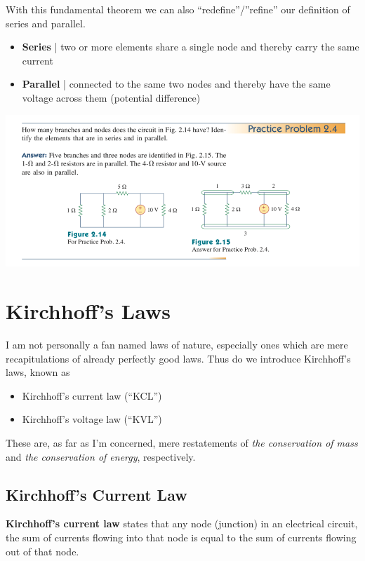 \documentclass[11pt]{book}
\begin{document}
With this fundamental theorem we can also “redefine”/”refine” our definition of series and parallel.
\begin{itemize}
	\item \textbf{Series} | two or more elements share a single node and thereby carry the same current
	\item \textbf{Parallel} | connected to the same two nodes and thereby have the same voltage across them (potential difference)
\end{itemize}

\begin{center}
	\includegraphics{figures/04.example1.png}
\end{center}

 
\newpage
\section{Kirchhoff's Laws}
I am not personally a fan named laws of nature, especially ones which are mere recapitulations of already perfectly good laws. Thus do we introduce Kirchhoff’s laws, known as 
\begin{itemize}
	\item Kirchhoff’s current law (``KCL'') 
	\item Kirchhoff’s voltage law (``KVL'')  
\end{itemize}
	
These are, as far as I’m concerned, mere restatements of \textit{the conservation of mass} and \textit{the conservation of energy}, respectively.


\subsection{Kirchhoff's Current Law}
\textbf{Kirchhoff's current law} states that any node (junction) in an electrical circuit, the sum of currents flowing into that node is equal to the sum of currents flowing out of that node.
\end{document}
